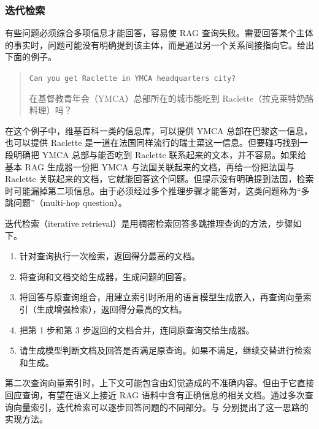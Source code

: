 \subsubsection{迭代检索}
\label{sec:ch07-iterative}
有些问题必须综合多项信息才能回答，容易使 RAG 查询失败。需要回答某个主体的事实时，问题可能没有明确提到该主体，而是通过另一个关系间接指向它。给出下面的例子。

\begin{quote}
\texttt{Can you get Raclette in YMCA headquarters city?}

在基督教青年会（YMCA）总部所在的城市能吃到 Raclette（拉克莱特奶酪料理）吗？
\end{quote}

在这个例子中，维基百科一类的信息库，可以提供 YMCA 总部在巴黎这一信息，也可以提供 Raclette 是一道在法国同样流行的瑞士菜这一信息。但要碰巧找到一段明确把 YMCA 总部与能否吃到 Raclette 联系起来的文本，并不容易。如果给基本 RAG 生成器一份把 YMCA 与法国关联起来的文档，再给一份把法国与 Raclette 关联起来的文档，它就能回答这个问题。但提示没有明确提到法国，检索时可能漏掉第二项信息。由于必须经过多个推理步骤才能答对，这类问题称为“多跳问题”（multi-hop question）。

\begin{keypoint}
迭代检索（iterative retrieval）是用稠密检索回答多跳推理查询的方法，步骤如下。
\begin{enumerate}
\item 针对查询执行一次检索，返回得分最高的文档。
\item 将查询和文档交给生成器，生成问题的回答。
\item 将回答与原查询组合，用建立索引时所用的语言模型生成嵌入，再查询向量索引（生成增强检索），返回得分最高的文档。
\item 把第 1 步和第 3 步返回的文档合并，连同原查询交给生成器。
\item 请生成模型判断文档及回答是否满足原查询。如果不满足，继续交替进行检索和生成。
\end{enumerate}
\end{keypoint}

\begin{practicaltip}
第二次查询向量索引时，上下文可能包含由幻觉造成的不准确内容。但由于它直接回应查询，有望在语义上接近 RAG 语料中含有正确信息的相关文档。通过多次查询向量索引，迭代检索可以逐步回答问题的不同部分。与 分别提出了这一思路的实现方法。
\end{practicaltip}

